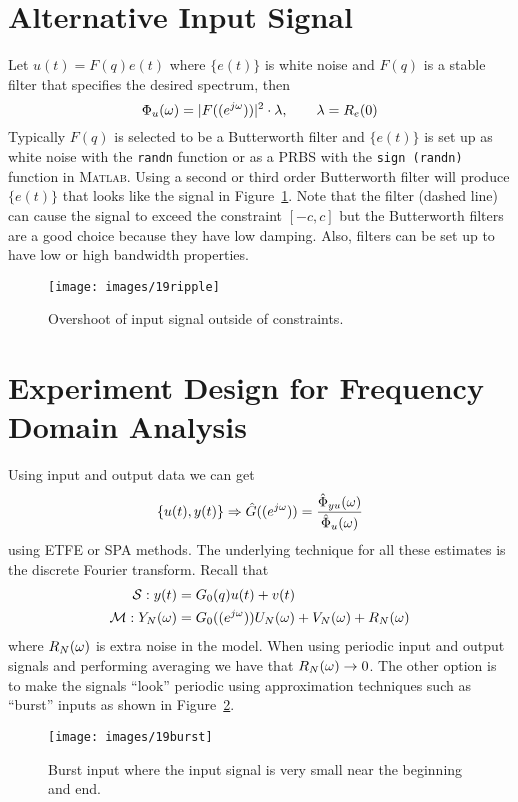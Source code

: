 \section{Alternative Input Signal}
Let $u(t)=F(q)e(t)$ where $\{e(t)\}$ is white noise and $F(q)$ is a stable filter that specifies the desired spectrum, then
$$\Phi_u(\omega) = |F((e^{j\omega}))|^2\cdot\lambda, \qquad \lambda = R_e(0)$$
Typically $F(q)$ is selected to be a Butterworth filter and $\{e(t)\}$ is set up as white noise with the \texttt{randn} function or as a PRBS with the \texttt{sign (randn)} function in \textsc{Matlab}.
Using a second or third order Butterworth filter will produce $\{e(t)\}$ that looks like the signal in Figure~\ref{fig:19ripple}.
Note that the filter (dashed line) can cause the signal to exceed the constraint $[-c,c]$ but the Butterworth filters are a good choice because they have low damping.
Also, filters can be set up to have low or high bandwidth properties.

\begin{figure}[ht!]
\centering
\texttt{[image: images/19ripple]}
\caption{Overshoot of input signal outside of constraints.}
\label{fig:19ripple}
\end{figure}

\section{Experiment Design for Frequency Domain Analysis}
Using input and output data we can get
$$\{u(t),y(t)\} \Rightarrow \hat{G}((e^{j\omega})) = \frac{\hat{\Phi}_{yu}(\omega)}{\hat{\Phi}_u(\omega)}$$
using ETFE or SPA methods.
The underlying technique for all these estimates is the discrete Fourier transform.
Recall that
\begin{align*}
\mathcal{S}: y(t) &= G_0(q)u(t) + v(t) \\
\mathcal{M}: Y_N(\omega) &= G_0((e^{j\omega}))U_N(\omega) + V_N(\omega) + R_N(\omega)
\end{align*}
where $R_N(\omega)$ is extra noise in the model.
When using periodic input and output signals and performing averaging we have that $R_N(\omega)\to0$.
The other option is to make the signals ``look'' periodic using approximation techniques such as ``burst'' inputs as shown in Figure~\ref{fig:19burst}.

\begin{figure}[ht!]
\centering
\texttt{[image: images/19burst]}
\caption{Burst input where the input signal is very small near the beginning and end.}
\label{fig:19burst}
\end{figure}

